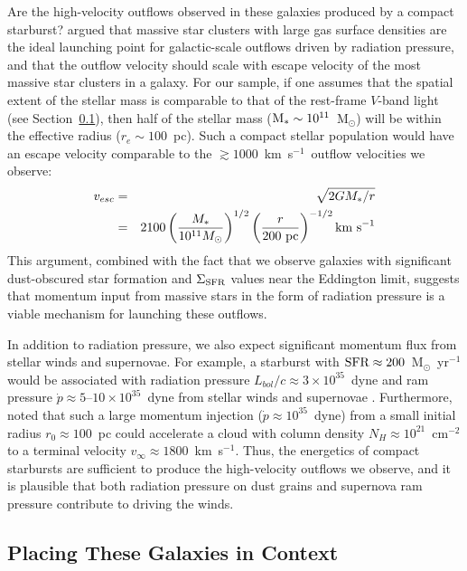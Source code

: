 \documentclass[12pt,preprint]{aastex}
\newcommand{\kms}{km~s$^{-1}$}
\newcommand{\msun}{M$_{\odot}$}
\newcommand{\mstar}{M$_{*}$}
\newcommand{\sigmasfr}{\Sigma_{\textnormal{\scriptsize{SFR}}}}
\begin{document}
Are the high-velocity outflows observed in these galaxies produced by
a compact starburst?  \citet{mur11} argued that massive star clusters
with large gas surface densities are the ideal launching point for
galactic-scale outflows driven by radiation pressure, and that the
outflow velocity should scale with escape velocity of the most massive
star clusters in a galaxy.  For our sample, if one assumes that the
spatial extent of the stellar mass is comparable to that of the
rest-frame $V$-band light (see Section~\ref{sec:context}), then half
of the stellar mass ($\textnormal{\mstar}\sim10^{11}$~\msun) will be
within the effective radius ($r_{e}\sim100$~pc).  Such a compact
stellar population would have an escape velocity comparable to the
$\gtrsim1000$~\kms\ outflow velocities we observe:
\begin{eqnarray}\nonumber
v_{esc}&=&\sqrt{2GM_{*}/r} \\
&=& 2100
\left({M_{*}\over10^{11} M_{\odot}}\right)^{1/2} 
\left({r\over200~\textnormal{pc}}\right)^{-1/2}
\textnormal{km~s}^{-1} 
\label{eq:vesc}
\end{eqnarray}
This argument, combined with the fact that we observe galaxies with
significant dust-obscured star formation and $\sigmasfr$ values near
the Eddington limit, suggests that momentum input from massive stars
in the form of radiation pressure is a viable mechanism for launching
these outflows.

In addition to radiation pressure, we also expect significant momentum
flux from stellar winds and supernovae.  For example, a starburst with
$\textnormal{SFR}\approx200$~\msun~yr$^{-1}$ would be associated with
radiation pressure $L_{bol}/c\approx3\times10^{35}$~dyne and ram
pressure $\dot{p}\approx5$--$10\times10^{35}$~dyne from stellar winds
and supernovae \citep{lei92,lei99,vei05}.  Furthermore, \citet{hec11}
noted that such a large momentum injection
($\dot{p}\approx10^{35}$~dyne) from a small initial radius
$r_{0}\approx100$~pc could accelerate a cloud with column density
$N_{H}\approx10^{21}$~cm$^{-2}$ to a terminal velocity
$v_{\infty}\approx1800$~\kms.  Thus, the energetics of compact
starbursts are sufficient to produce the high-velocity outflows we
observe, and it is plausible that both radiation pressure on dust
grains and supernova ram pressure contribute to driving the winds.


\subsection{Placing These Galaxies in Context}\label{sec:context}
\end{document}
